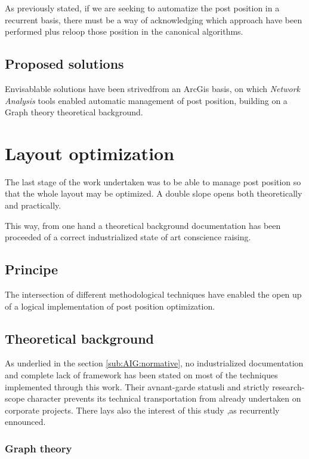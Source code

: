 As previously stated, if we are seeking to automatize the post position in a recurrent basis, there must be a way of acknowledging which approach have been performed plus reloop those position in the canonical algorithms. 

\subsection{Proposed solutions}
\label{sub:AIG:technical-issues:proposed-solutions}

 Envisablable solutions have been strivedfrom an ArcGis basis, on which \textit{Network Analysis} tools enabled automatic management of post position, building on a Graph theory theoretical background.
 
\section{Layout optimization}
\label{sec:AIG:layout_optimization}

The last stage of the work undertaken was to be able to manage post position so that the whole layout may be optimized. A double slope opens  both theoretically and practically.

This way, from one hand a theoretical background documentation has been proceeded of a correct industrialized state of art conscience raising. 

\subsection{Principe}

The intersection of different methodological techniques have enabled the open up of a logical implementation of post position optimization.

\subsection{Theoretical background}
\label{sub:AIG:SLV:theoretical background}

As underlied in the section \ref{sub:AIG:normative}, no industrialized documentation and complete lack of framework has been stated on most of the techniques implemented through this work. Their avnant-garde statusli and strictly research-scope character prevents its technical transportation from already undertaken on corporate projects. There lays also the interest of this study ,as recurrently ennounced.

\subsubsection{Graph theory}
\label{subsub:AIG:SLV:graph_theory}

